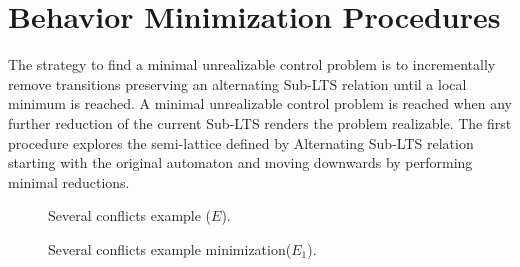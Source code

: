\section{Behavior Minimization Procedures}\label{sect:solution}

The strategy to find a minimal unrealizable control problem is to incrementally remove transitions preserving an alternating Sub-LTS relation until a local minimum is reached.  A minimal unrealizable control problem is reached when any further reduction of the current Sub-LTS renders the problem realizable.
The first procedure explores the semi-lattice defined by Alternating Sub-LTS relation starting with the original automaton and moving downwards by performing minimal reductions. 
  
\begin{figure}[bt]
\centering
\SmallPicture
{}
\caption{Several conflicts example ($E$).}
\label{fig:fig.several-conflicts}
\MediumPicture
\end{figure}

\begin{figure}[bt]
\centering
\SmallPicture
{}
\caption{Several conflicts example minimization($E_1$).}
\label{fig:fig.several-conflicts-min1}
\MediumPicture
\vspace{-1em}
\end{figure}

